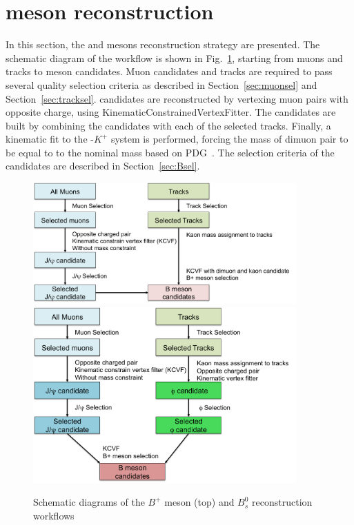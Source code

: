 \section{\Bplus meson reconstruction}

In this section, the \Bplus and \PBzs mesons reconstruction strategy are presented. 
The schematic diagram of the workflow is shown in Fig.~\ref{fig:workflow}, starting from muons and tracks to \Bplus meson candidates. 
Muon candidates and tracks are required to pass several quality selection criteria as described in Section~\ref{sec:muonsel} and Section~\ref{sec:tracksel}. 
\Jpsi candidates are reconstructed by vertexing muon pairs with opposite charge, using {\footnotesize KinematicConstrainedVertexFitter}.
The \Bplus candidates are built by combining the \Jpsi candidates with each of the selected tracks.
Finally, a kinematic fit to the \Jpsi-$K^+$ system is performed, forcing the mass of dimuon pair to be equal to to the nominal \Jpsi mass based on PDG~\cite{PDG:2018}.
The selection criteria of the \Bplus candidates are described in Section~\ref{sec:Bsel}. \\

\begin{figure}[h]
\centering
\includegraphics[width=0.9\textwidth]{Plots/BmesonReconstruction/BP.png}
\includegraphics[width=0.9\textwidth]{Plots/BmesonReconstruction/Bs.png}
\caption{Schematic diagrams of the $B^+$ meson (top) and $B^0_s$ reconstruction workflows}
\label{fig:workflow}
\end{figure}


